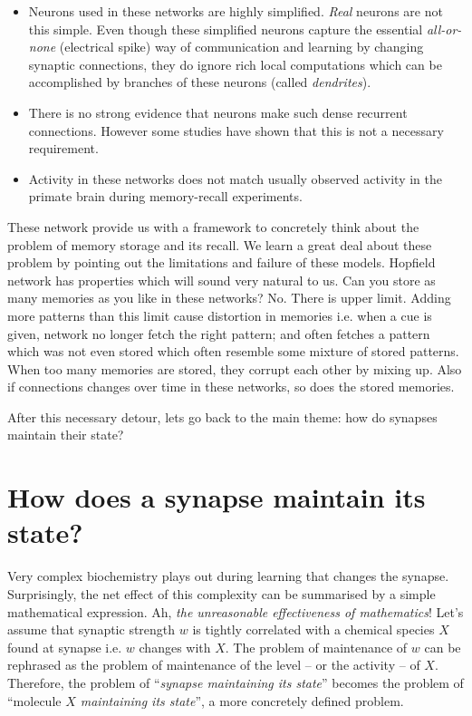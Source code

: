 \documentclass[]{resonance}
\begin{document}
\begin{itemize}
    \item  Neurons used in these networks are highly simplified. \textit{Real}
        neurons are not this simple. Even though these simplified neurons
        capture the essential \textit{all-or-none} (electrical spike) way of
        communication and learning by changing synaptic connections, they do
        ignore rich local computations which can be accomplished by branches of
        these neurons (called \textit{dendrites}).
    \item  There is no strong evidence that neurons make such dense recurrent
        connections. However some studies have shown that this is not a
        necessary requirement.
    \item Activity in these networks does not match usually observed activity 
        in the primate brain during memory-recall experiments.
\end{itemize}


These network provide us with a framework to concretely think about the problem
of memory storage and its recall. We learn a great deal about these problem by
pointing out the limitations and failure of these models. Hopfield network has
properties which will sound very natural to us. Can you store as many memories
as you like in these networks? No. There is upper limit. Adding more patterns
than this limit cause distortion in memories i.e. when a cue is given, network
no longer fetch the right pattern; and often fetches a pattern which was not
even stored which often resemble some mixture of stored patterns. When too many
memories are stored, they corrupt each other by mixing up. Also if connections
changes over time in these networks, so does the stored memories.

After this necessary detour, lets go back to the main theme: how do synapses
maintain their state?

\section{How does a synapse maintain its state?}

Very complex biochemistry plays out during learning that changes the synapse.
Surprisingly, the net effect of this complexity can be summarised by a simple
mathematical expression. Ah, \emph{the unreasonable effectiveness of
mathematics}\cite{unreasonable_math}! Let's assume that synaptic strength $w$ is
tightly correlated with a chemical species $X$ found at synapse i.e. $w$ changes
with $X$.  The problem of maintenance of $w$ can be rephrased as the problem of
maintenance of the level -- or the activity -- of $X$. Therefore, the problem of
``\emph{synapse maintaining its state}'' becomes the problem of ``molecule
\emph{$X$ maintaining its state}'', a more concretely defined problem.
\end{document}
